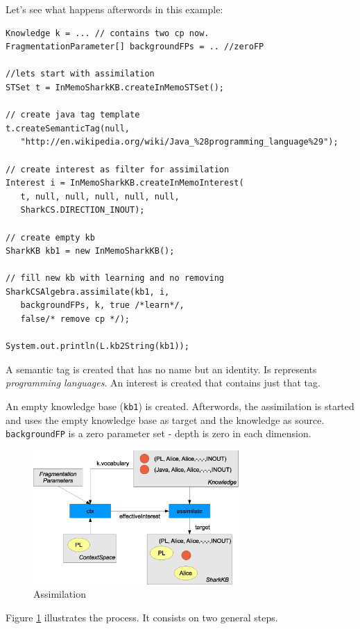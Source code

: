 Let's see what happens afterwords in this example:

\begin{verbatim}
Knowledge k = ... // contains two cp now.
FragmentationParameter[] backgroundFPs = .. //zeroFP

//lets start with assimilation
STSet t = InMemoSharkKB.createInMemoSTSet();

// create java tag template
t.createSemanticTag(null,
   "http://en.wikipedia.org/wiki/Java_%28programming_language%29");

// create interest as filter for assimilation
Interest i = InMemoSharkKB.createInMemoInterest(
   t, null, null, null, null, null,
   SharkCS.DIRECTION_INOUT);

// create empty kb
SharkKB kb1 = new InMemoSharkKB();

// fill new kb with learning and no removing
SharkCSAlgebra.assimilate(kb1, i,
   backgroundFPs, k, true /*learn*/,
   false/* remove cp */);

System.out.println(L.kb2String(kb1));

\end{verbatim}

A semantic tag is created that has no name but an identity. Is represents {\it programming languages}. An interest is created that contains just that tag.

An empty knowledge base ({\tt kb1}) is created. Afterwords, the assimilation is started and uses the empty knowledge base as target and the knowledge as source.
{\tt backgroundFP} is a zero parameter set - depth is zero in each dimension.

\begin{figure}[t]
\centering
\includegraphics[width=0.70\textwidth]{assimilation.eps}
\caption{Assimilation}
\label{fig:assimilation}
\end{figure}

Figure \ref{fig:assimilation} illustrates the process. It consists on two general steps.

